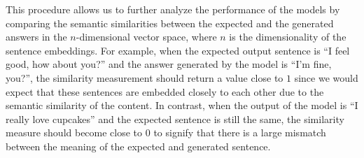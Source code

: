 This procedure allows us to further analyze the performance of the models by comparing the semantic similarities between the expected and the generated answers in the $n$-dimensional vector space, where $n$ is the dimensionality of the sentence embeddings. For example, when the expected output sentence is ``I feel good, how about you?'' and the answer generated by the model is ``I'm fine, you?'', the similarity measurement should return a value close to $1$ since we would expect that these sentences are embedded closely to each other due to the semantic similarity of the content. In contrast, when the output of the model is ``I really love cupcakes'' and the expected sentence is still the same, the similarity measure should become close to $0$ to signify that there is a large mismatch between the meaning of the expected and generated sentence.

